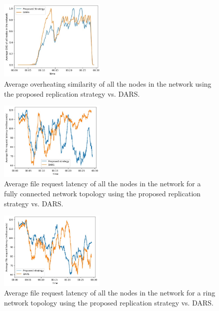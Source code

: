 \documentclass[10pt, conference]{IEEEtran}
\begin{document}
\begin{figure}[htbp]
    \centering
    \includegraphics[width=0.45\textwidth]
    {project/fig/ohs.jpg}
    \caption{Average overheating similarity of all the nodes in the network using the proposed replication strategy vs. DARS.}
    \label{fig:ohs}
\end{figure}

\begin{figure}[htbp]
    \centering
    \includegraphics[width=0.45\textwidth]
    {project/fig/latency-full.jpg}
    \caption{Average file request latency of all the nodes in the network for a fully connected network topology using the proposed replication strategy vs. DARS.}
    \label{fig:latency-full}
\end{figure}

\begin{figure}[htbp]
    \centering
    \includegraphics[width=0.45\textwidth]
    {project/fig/latency-ring.jpg}
    \caption{Average file request latency of all the nodes in the network for a ring network topology using the proposed replication strategy vs. DARS.}
    \label{fig:latency-ring}
\end{figure}
\end{document}
